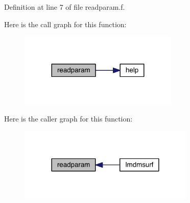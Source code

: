 Definition at line 7 of file readparam.\+f.



Here is the call graph for this function\+:\nopagebreak
\begin{figure}[H]
\begin{center}
\leavevmode
\includegraphics[width=215pt]{readparam_8f_a7fe08a66ddc7f33d6f9822fca9b8f122_cgraph}
\end{center}
\end{figure}




Here is the caller graph for this function\+:\nopagebreak
\begin{figure}[H]
\begin{center}
\leavevmode
\includegraphics[width=237pt]{readparam_8f_a7fe08a66ddc7f33d6f9822fca9b8f122_icgraph}
\end{center}
\end{figure}


